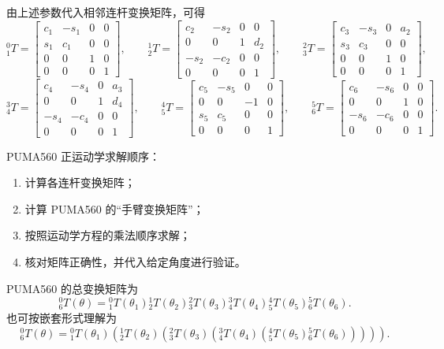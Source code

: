 由上述参数代入相邻连杆变换矩阵，可得
\[
{}^0_1T=
\begin{bmatrix}
 c_1 & -s_1 & 0 & 0 \\
 s_1 & c_1 & 0 & 0 \\
 0 & 0 & 1 & 0 \\
 0 & 0 & 0 & 1
\end{bmatrix},
\qquad
{}^1_2T=
\begin{bmatrix}
 c_2 & -s_2 & 0 & 0 \\
 0 & 0 & 1 & d_2 \\
 -s_2 & -c_2 & 0 & 0 \\
 0 & 0 & 0 & 1
\end{bmatrix},
\qquad
{}^2_3T=
\begin{bmatrix}
 c_3 & -s_3 & 0 & a_2 \\
 s_3 & c_3 & 0 & 0 \\
 0 & 0 & 1 & 0 \\
 0 & 0 & 0 & 1
\end{bmatrix},
\]
\[
{}^3_4T=
\begin{bmatrix}
 c_4 & -s_4 & 0 & a_3 \\
 0 & 0 & 1 & d_4 \\
 -s_4 & -c_4 & 0 & 0 \\
 0 & 0 & 0 & 1
\end{bmatrix},
\qquad
{}^4_5T=
\begin{bmatrix}
 c_5 & -s_5 & 0 & 0 \\
 0 & 0 & -1 & 0 \\
 s_5 & c_5 & 0 & 0 \\
 0 & 0 & 0 & 1
\end{bmatrix},
\qquad
{}^5_6T=
\begin{bmatrix}
 c_6 & -s_6 & 0 & 0 \\
 0 & 0 & 1 & 0 \\
 -s_6 & -c_6 & 0 & 0 \\
 0 & 0 & 0 & 1
\end{bmatrix}.
\]

PUMA560 正运动学求解顺序：
\begin{enumerate}
  \item 计算各连杆变换矩阵；
  \item 计算 PUMA560 的“手臂变换矩阵”；
  \item 按照运动学方程的乘法顺序求解；
  \item 核对矩阵正确性，并代入给定角度进行验证。
\end{enumerate}

PUMA560 的总变换矩阵为
\[
{}^0_6T(\theta)
= {}^0_1T(\theta_1)
{}^1_2T(\theta_2)
{}^2_3T(\theta_3)
{}^3_4T(\theta_4)
{}^4_5T(\theta_5)
{}^5_6T(\theta_6).
\]
也可按嵌套形式理解为
\[
{}^0_6T(\theta)
= {}^0_1T(\theta_1)
\left({}^1_2T(\theta_2)
\left({}^2_3T(\theta_3)
\left({}^3_4T(\theta_4)
\left({}^4_5T(\theta_5)
{}^5_6T(\theta_6)\right)\right)\right)\right).
\]

